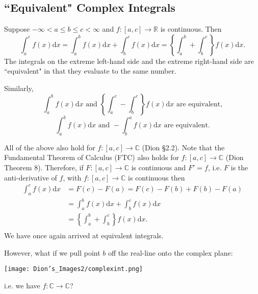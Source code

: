 
\subsection{``Equivalent" Complex Integrals}

Suppose $-\infty < a \leq b \leq c < \infty$ and $f:[a,c] \rightarrow \mathbb{R}$ is continuous. Then
$$\int^c_a f(x) \mathrm{d}x = \int^b_a f(x) \mathrm{d}x + \int^c_b f(x) \mathrm{d}x = \left\{ \int_a^b + \int_b^c \right \} f(x) \mathrm{d}x.$$
The integrals on the extreme left-hand side and the extreme right-hand side are ``equivalent" in that they evaluate to the same number.

Similarly,
$$\int^b_a f(x) \mathrm{d}x \mbox{ and } \left\{ \int_a^c - \int_b^c \right \} f(x) \mathrm{d}x \mbox{ are equivalent,}$$
$$\int^b_a f(x) \mathrm{d}x \mbox{ and } -\int^a_b f(x) \mathrm{d}x \mbox{ are equivalent.}$$

All of the above also hold for $f:[a,c] \rightarrow \mathbb{C}$ (Dion \S2.2).
Note that the Fundamental Theorem of Calculus (FTC) also holds for $f:[a,c] \rightarrow \mathbb{C}$ (Dion Theorem 8). 
Therefore, if $F: [a,c] \rightarrow \mathbb{C}$ is continuous and $F' = f$, i.e. $F$ is the anti-derivative of $f$, with $f:[a,c] \rightarrow \mathbb{C}$ is continuous then
\begin{align*}
\int^c_a f(x) \mathrm{d}x &= F(c) - F(a) = F(c) - F(b) + F(b) - F(a) \\
&= \int^b_a f(x) \mathrm{d}x + \int^c_b f(x) \mathrm{d}x \\
&= \left\{ \int_a^b + \int_b^c \right \} f(x) \mathrm{d}x. \\
\end{align*}
We have once again arrived at equivalent integrals.

However, what if we pull point $b$ off the real-line onto the complex plane:

\centerline{\texttt{[image: Dion's\_Images2/complexint.png]}}

i.e. we have $f:\mathbb{C} \rightarrow \mathbb{C}$?


